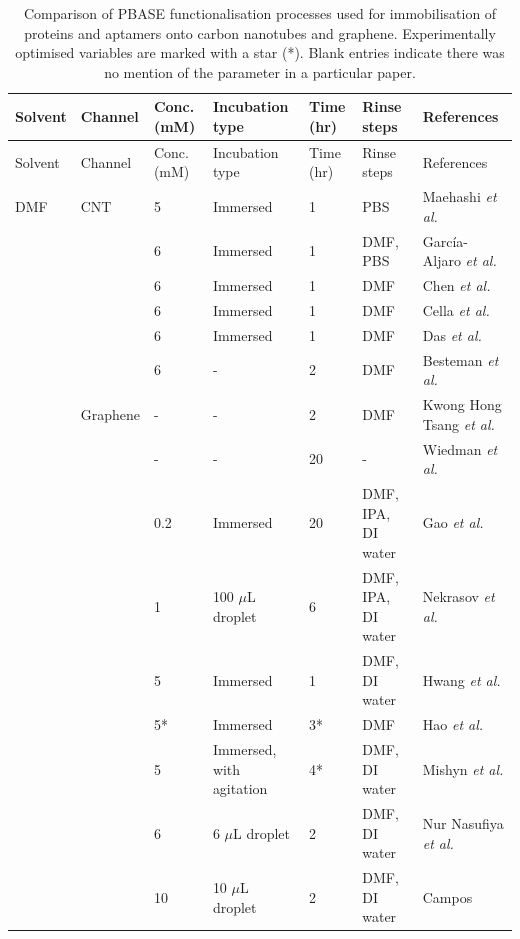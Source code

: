 \documentclass[
  a4paper,
]{scrbook}
\begin{document}
\hypertarget{tbl-pbase-functionalisation}{}
\begin{longtable}[]{@{}lllllll@{}}
\caption{\label{tbl-pbase-functionalisation}Comparison of PBASE
functionalisation processes used for immobilisation of proteins and
aptamers onto carbon nanotubes and graphene. Experimentally optimised
variables are marked with a star (*). Blank entries indicate there was
no mention of the parameter in a particular paper.}\tabularnewline
\toprule\noalign{}
Solvent & Channel & Conc. (mM) & Incubation type & Time (hr) & Rinse
steps & References \\
\midrule\noalign{}
\endfirsthead
\toprule\noalign{}
Solvent & Channel & Conc. (mM) & Incubation type & Time (hr) & Rinse
steps & References \\
\midrule\noalign{}
\endhead
\bottomrule\noalign{}
\endlastfoot
DMF & CNT & 5 & Immersed & 1 & PBS & Maehashi \textit{et al.}
\cite{Maehashi2007} \\
& & 6 & Immersed & 1 & DMF, PBS & García-Aljaro \textit{et al.}
\cite{Garcia-Aljaro2010} \\
& & 6 & Immersed & 1 & DMF & Chen \textit{et al.} \cite{Chen2001} \\
& & 6 & Immersed & 1 & DMF & Cella \textit{et al.} \cite{Cella2010} \\
& & 6 & Immersed & 1 & DMF & Das \textit{et al.} \cite{Das2011} \\
& & 6 & - & 2 & DMF & Besteman \textit {et al.} \cite{Besteman2003} \\
& Graphene & - & - & 2 & DMF & Kwong Hong Tsang \textit{et al.}
\cite{KwongHongTsang2019} \\
& & - & - & 20 & - & Wiedman \textit{et al.} \cite{Wiedman2017} \\
& & 0.2 & Immersed & 20 & DMF, IPA, DI water & Gao \textit{et al.}
\cite{Gao2018} \\
& & 1 & 100 \(\mu\)L droplet & 6 & DMF, IPA, DI water & Nekrasov
\textit{et al.} \cite{Nekrasov2021} \\
& & 5 & Immersed & 1 & DMF, DI water & Hwang \textit{et al.}
\cite{Hwang2016} \\
& & 5* & Immersed & 3* & DMF & Hao \textit{et al.} \cite{Hao2020} \\
& & 5 & Immersed, with agitation & 4* & DMF, DI water & Mishyn
\textit{et al.} \cite{Mishyn2022} \\
& & 6 & 6 \(\mu\)L droplet & 2 & DMF, DI water & Nur Nasufiya
\textit{et al.} \cite{NurNasyifa2020} \\
& & 10 & 10 \(\mu\)L droplet & 2 & DMF, DI water & Campos

\end{longtable}
\end{document}
